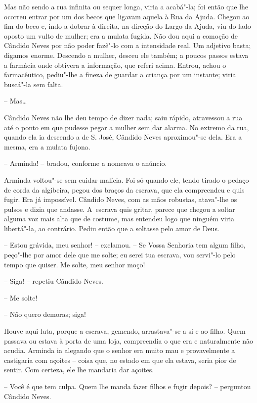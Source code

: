 Mas não sendo a rua infinita ou sequer longa, viria a acabá"-la; foi
então que lhe ocorreu entrar por um dos becos que ligavam aquela à Rua
da Ajuda. Chegou ao fim do beco e, indo a dobrar à direita, na direção
do Largo da Ajuda, viu do lado oposto um vulto de mulher; era a mulata
fugida. Não dou aqui a comoção de Cândido Neves por não poder fazê"-lo
com a intensidade real. Um adjetivo basta; digamos enorme. Descendo a
mulher, desceu ele também; a poucos passos estava a farmácia onde
obtivera a informação, que referi acima. Entrou, achou o farmacêutico,
pediu"-lhe a fineza de guardar a criança por um instante; viria buscá"-la
sem falta.

-- Mas\ldots{}

Cândido Neves não lhe deu tempo de dizer nada; saiu rápido, atravessou a
rua até o ponto em que pudesse pegar a mulher sem dar alarma. No extremo
da rua, quando ela ia descendo a de S. José, Cândido Neves aproximou"-se
dela. Era a mesma, era a mulata fujona.

-- Arminda! -- bradou, conforme a nomeava o anúncio.

Arminda voltou"-se sem cuidar malícia. Foi só quando ele, tendo tirado o
pedaço de corda da algibeira, pegou dos braços da escrava, que ela
compreendeu e quis fugir. Era já impossível. Cândido Neves, com as mãos
robustas, atava"-lhe os pulsos e dizia que andasse. A~escrava quis
gritar, parece que chegou a soltar alguma voz mais alta que de costume,
mas entendeu logo que ninguém viria libertá"-la, ao contrário. Pediu
então que a soltasse pelo amor de Deus.

-- Estou grávida, meu senhor! -- exclamou. -- Se Vossa Senhoria tem
algum filho, peço"-lhe por amor dele que me solte; eu serei tua escrava,
vou servi"-lo pelo tempo que quiser. Me solte, meu senhor moço!

-- Siga! -- repetiu Cândido Neves.

-- Me solte!

-- Não quero demoras; siga!

Houve aqui luta, porque a escrava, gemendo, arrastava"-se a si e ao
filho. Quem passava ou estava à porta de uma loja, compreendia o que era
e naturalmente não acudia. Arminda ia alegando que o senhor era muito
mau e provavelmente a castigaria com açoites -- coisa que, no estado em
que ela estava, seria pior de sentir. Com certeza, ele lhe mandaria dar
açoites.

-- Você é que tem culpa. Quem lhe manda fazer filhos e fugir depois? --
perguntou Cândido Neves.

